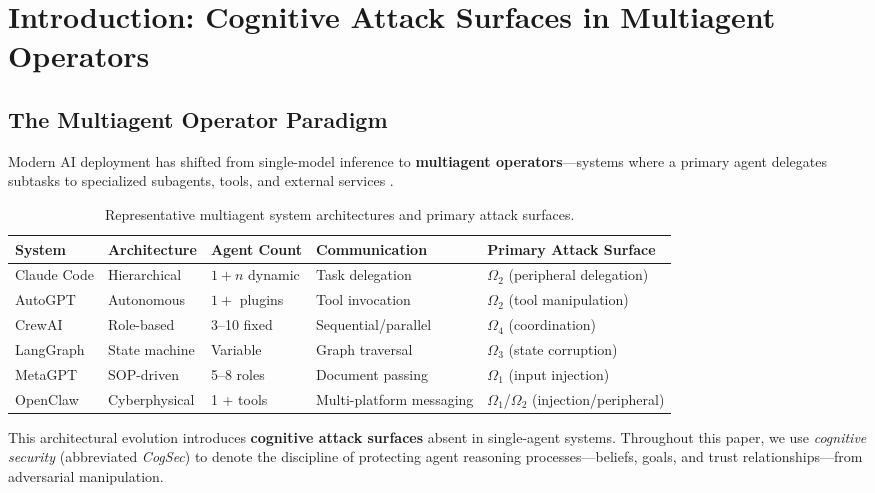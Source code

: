 \documentclass[
]{article}
\begin{document}
\newpage

\newpage

\section{Introduction: Cognitive Attack Surfaces in Multiagent
Operators}\label{introduction-cognitive-attack-surfaces-in-multiagent-operators}

\subsection{The Multiagent Operator Paradigm}\label{sec:paradigm}

Modern AI deployment has shifted from single-model inference to
\textbf{multiagent operators}---systems where a primary agent delegates
subtasks to specialized subagents, tools, and external services
\citep{crewai2024, langgraph2023, hong2023metagpt}.

\begin{table}[htbp]
\centering
\caption{Representative multiagent system architectures and primary attack surfaces.}
\label{tab:architectures}
\begin{tabular}{@{}lllll@{}}
\toprule
System & Architecture & Agent Count & Communication & Primary Attack Surface \\
\midrule
Claude Code & Hierarchical & $1 + n$ dynamic & Task delegation & $\Omega_2$ (peripheral delegation) \\
AutoGPT & Autonomous & $1 +$ plugins & Tool invocation & $\Omega_2$ (tool manipulation) \\
CrewAI & Role-based & 3--10 fixed & Sequential/parallel & $\Omega_4$ (coordination) \\
LangGraph & State machine & Variable & Graph traversal & $\Omega_3$ (state corruption) \\
MetaGPT & SOP-driven & 5--8 roles & Document passing & $\Omega_1$ (input injection) \\
OpenClaw & Cyberphysical & 1 + tools & Multi-platform messaging & $\Omega_1$/$\Omega_2$ (injection/peripheral) \\
\bottomrule
\end{tabular}
\end{table}

This architectural evolution introduces \textbf{cognitive attack
surfaces} absent in single-agent systems. Throughout this paper, we use
\emph{cognitive security} (abbreviated \emph{CogSec}) to denote the
discipline of protecting agent reasoning processes---beliefs, goals, and
trust relationships---from adversarial manipulation.
\end{document}
